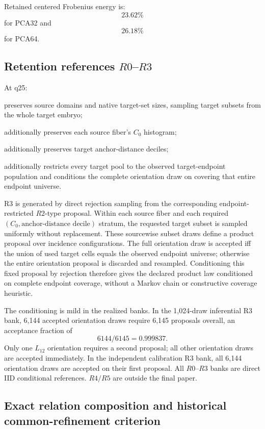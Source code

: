 \documentclass[11pt]{article}
\newcommand{\Czero}{C_0}
\begin{document}
Retained centered Frobenius energy is:
\[
23.62\%
\]
for PCA32 and
\[
26.18\%
\]
for PCA64.

\subsection{Retention references \(R0\)--\(R3\)}

At q25:
\begin{description}[leftmargin=2.2cm,style=nextline]
\item[\(R0\)] preserves source domains and native target-set sizes, sampling target subsets from the whole target embryo;
\item[\(R1\)] additionally preserves each source fiber's \(\Czero\) histogram;
\item[\(R2\)] additionally preserves target anchor-distance deciles;
\item[\(R3\)] additionally restricts every target pool to the observed target-endpoint population and conditions the complete orientation draw on covering that entire endpoint universe.
\end{description}

R3 is generated by direct rejection sampling from the corresponding endpoint-restricted \(R2\)-type proposal. Within each source fiber and each required \((\Czero,\text{anchor-distance decile})\) stratum, the requested target subset is sampled uniformly without replacement. These sourcewise subset draws define a product proposal over incidence configurations. The full orientation draw is accepted iff the union of used target cells equals the observed endpoint universe; otherwise the entire orientation proposal is discarded and resampled. Conditioning this fixed proposal by rejection therefore gives the declared product law conditioned on complete endpoint coverage, without a Markov chain or constructive coverage heuristic.

The conditioning is mild in the realized banks. In the 1,024-draw inferential R3 bank, 6,144 accepted orientation draws require 6,145 proposals overall, an acceptance fraction of
\[
6144/6145=0.999837.
\]
Only one \(L_{12}\) orientation requires a second proposal; all other orientation draws are accepted immediately. In the independent calibration R3 bank, all 6,144 orientation draws are accepted on their first proposal. All \(R0\)--\(R3\) banks are direct IID conditional references. \(R4/R5\) are outside the final paper.

\subsection{Exact relation composition and historical common-refinement criterion}
\end{document}
